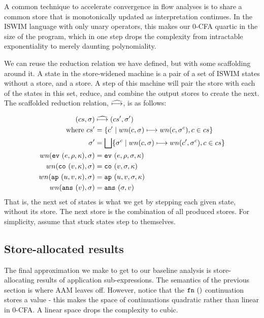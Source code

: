 \documentclass[preprint,onecolumn,9pt]{sigplanconf} %
\begin{document}
A common technique to accelerate convergence in flow analyses is to share
a common store that is monotonically updated as interpretation
continues. In the ISWIM language with only unary operators, this makes
our 0-CFA quartic in the size of the program, which in one step drops the
complexity from intractable exponentiality to merely daunting
polynomiality.

We can reuse the reduction relation we have defined, but with some
scaffolding around it. A state in the store-widened machine is a pair
of a set of ISWIM states without a store, and a store. A step of this
machine will pair the store with each of the states in this set,
reduce, and combine the output stores to create the next. The
scaffolded reduction relation, $\widehat{\longmapsto}$, is as follows:

\begin{align*}
(cs, \sigma) &\mathrel{\widehat{\longmapsto}} (cs', \sigma') \\
\mbox{where } cs' &= \{c' \mid wn(c, \sigma) \mathrel{\longmapsto} wn(c, \sigma^c), c \in cs\} \\
              \sigma' &= \bigsqcup\{\sigma^c \mid wn(c,\sigma)\mathrel{\longmapsto} wn(c', \sigma^c), c \in cs\} \\
wn({\tt ev{\ }}({e, \rho, \kappa}), \sigma) &= {\tt ev{\ }}({e, \rho, \sigma, \kappa}) \\
wn({\tt co{\ }}({v, \kappa}), \sigma) &= {\tt co{\ }}({v, \sigma, \kappa}) \\
wn({\tt ap{\ }}({u, v, \kappa}), \sigma) &= {\tt ap{\ }}({u, v, \sigma, \kappa}) \\
wn({\tt ans{\ }}({v}), \sigma) &= {\tt ans{\ }}({\sigma, v})
\end{align*}
That is, the next set of states is what we get by stepping each
given state, without its store. The next store is the combination of all produced
stores. For simplicity, assume that stuck states step to themselves.

\subsection{Store-allocated results}
\label{sec:baselineeval}

The final approximation we make to get to our baseline analysis is
store-allocating results of application sub-expressions. The semantics
of the previous section is where AAM leaves off. However, notice that
the ${\tt fn{\ }}({})$ continuation stores a value - this makes the space of
continuations quadratic rather than linear in 0-CFA. A linear space
drops the complexity to cubic.
\end{document}
